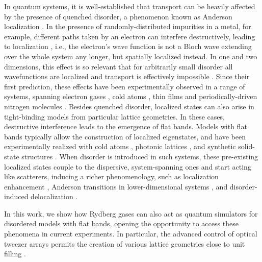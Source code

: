 \documentclass[prl,aps,twocolumn,showpacs,superscriptaddress,longbibliography]{revtex4-1}
\begin{document}
In quantum systems, it is well-established that transport can be heavily affected by the presence of quenched disorder, a phenomenon known as Anderson localization \cite{Anderson1958}. In the presence of randomly-distributed impurities in a metal, for example, different paths taken by an electron can interfere destructively, leading to localization , i.e., the electron's wave function is not a Bloch wave extending over the whole system any longer, but spatially localized instead. In one and two dimensions, this effect is so relevant that for arbitrarily small disorder all wavefunctions are localized and transport is effectively impossible \cite{Mott1961,Ishii1973}. Since their first prediction, these effects have been experimentally observed in a range of systems, spanning electron gases \cite{Cutler:1969}, cold atoms \cite{Billy:2008,Roati:2008,Semeghini:2015}, thin films \cite{Liao:2015} and periodically-driven nitrogen molecules \cite{Bitter:2016}. Besides quenched disorder, localized states can also arise in tight-binding models from particular lattice geometries. In these cases, destructive interference leads to the emergence of flat bands. Models with flat bands typically allow the construction of localized eigenstates, and have been experimentally realized with cold atoms \cite{Shen2010}, photonic lattices \cite{Mukherjee2015}, and synthetic solid-state structures \cite{slot2017, drost2017}. When disorder is introduced in such systems, these pre-existing localized states couple to the dispersive, system-spanning ones and start acting like scatterers, inducing a richer phenomenology, such as localization enhancement \cite{Leykam2017}, Anderson transitions in lower-dimensional systems \cite{Bodyfelt2014}, and disorder-induced delocalization \cite{Goda2006}. 

In this work, we show how Rydberg gases can also act as quantum simulators for disordered models with flat bands, opening the opportunity to access these phenomena in current experiments. In particular, the advanced control of optical tweezer arrays permits the creation of various lattice geometries \cite{Nogrette_2014, Barredo2017} close to unit filling \cite{Barredo_2016,Endres_2016}. 
\end{document}
